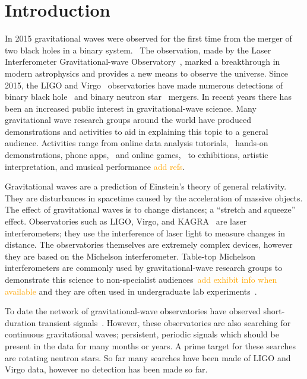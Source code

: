 \documentclass[prb,preprint]{revtex4-1}
\newcommand{\han}{\textcolor{orange}}
\begin{document}

\section{Introduction}

In 2015 gravitational waves were observed for the first time from the merger of two black holes in a binary system.~\cite{GW150914} 
The observation, made by the Laser Interferometer Gravitational-wave Observatory~\citep[LIGO]{AdvancedLIGO:2015}, marked a breakthrough in modern astrophysics and provides a new means to observe the universe. 
Since 2015, the LIGO and Virgo~\cite{AdvancedVirgo:2015} observatories have made numerous detections of binary black hole~\cite{GW151226,GW170104,GW170814} and binary neutron star~\cite{GW170817,GW170817multi,GW190425} mergers. 
In recent years there has been an increased public interest in gravitational-wave science. 
Many gravitational wave research groups around the world have produced demonstrations and activities to aid in explaining this topic to a general audience.
Activities range from online data analysis tutorials,~\cite{GWOSC:online,LOSC:2015} hands-on demonstrations, phone apps,~\cite{LaserLabs:online,SciVR:online} and online games,~\cite{BlackHoleHunter:online} to exhibitions,\cite{L2URSSE} artistic interpretation, and musical performance \han{add refs}. 



Gravitational waves are a prediction of Einstein's theory of general relativity. 
They are disturbances in spacetime caused by the acceleration of massive objects. 
The effect of gravitational waves is to change distances; a ``stretch and squeeze'' effect. 
Observatories such as LIGO, Virgo, and KAGRA~\cite{KAGRA:2013} are laser interferometers; they use the interference of laser light to measure changes in distance. 
The observatories themselves are extremely complex devices, however they are based on the Michelson interferometer. 
Table-top Michelson interferometers are commonly used by gravitational-wave research groups to demonstrate this science to non-specialist audiences~\cite{ThorLabsIFO,NikhefIFO}\han{add exhibit info when available} and they are often used in undergraduate lab experiments~\cite{UgoliniEtAl:2019}. 


To date the network of gravitational-wave observatories have observed short-duration transient signals~\cite{GWTC-1:2018,GWOSC:online}. 
However, these observatories are also searching for continuous gravitational waves; persistent, periodic signals which should be present in the data for many months or years. 
A prime target for these searches are rotating neutron stars. 
So far many searches have been made of LIGO and Virgo data, however no detection has been made so far.
\end{document}
